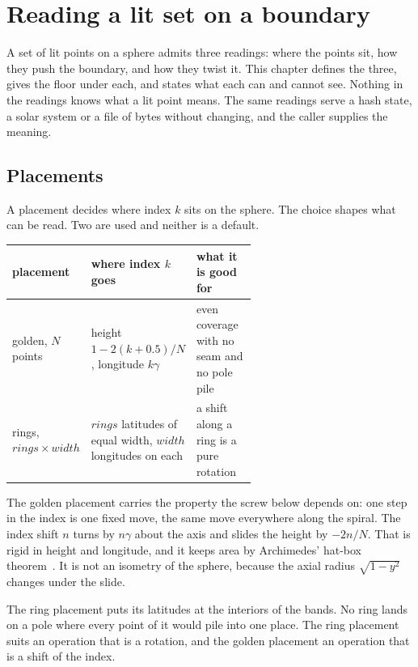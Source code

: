 \chapter{Reading a lit set on a boundary}

A set of lit points on a sphere admits three readings: where the points sit, how they push the boundary, and how they twist it. This chapter defines the three, gives the floor under each, and states what each can and cannot see. Nothing in the readings knows what a lit point means. The same readings serve a hash state, a solar system or a file of bytes without changing, and the caller supplies the meaning.

\section{Placements}

A placement decides where index \(k\) sits on the sphere. The choice shapes what can be read. Two are used and neither is a default.

\begin{center}
\begin{tabular}{@{}lp{0.3\linewidth}p{0.3\linewidth}@{}}
\toprule
placement & where index \(k\) goes & what it is good for \\
\midrule
golden, \(N\) points & height \(1 - 2(k+0.5)/N\), longitude \(k\gamma\)~\cite[Corollary~2]{src:Swierczkowski-1958} & even coverage with no seam and no pole pile~\cite{src:Gonzalez-2010} \\
rings, \(\mathit{rings} \times \mathit{width}\) & \(\mathit{rings}\) latitudes of equal width, \(\mathit{width}\) longitudes on each & a shift along a ring is a pure rotation \\
\bottomrule
\end{tabular}
\end{center}

The golden placement carries the property the screw below depends on: one step in the index is one fixed move, the same move everywhere along the spiral. The index shift \(n\) turns by \(n\gamma\) about the axis and slides the height by \(-2n/N\). That is rigid in height and longitude, and it keeps area by Archimedes' hat-box theorem~\cite[\emph{On the Sphere and Cylinder} I, Propositions 33, 42 and 43]{src:Heath-1897}. It is not an isometry of the sphere, because the axial radius \(\sqrt{1 - y^2}\) changes under the slide.

The ring placement puts its latitudes at the interiors of the bands. No ring lands on a pole where every point of it would pile into one place. The ring placement suits an operation that is a rotation, and the golden placement an operation that is a shift of the index.

